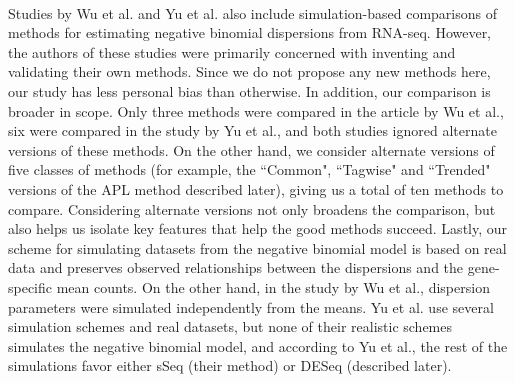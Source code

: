 \documentclass[10pt]{article}
\begin{document}
{\color{blue} \paragraph{} \indent Studies by Wu et al. \cite{dss} and Yu et al. \cite{yu} also include simulation-based comparisons of methods for estimating negative binomial dispersions from RNA-seq. However, the authors of these studies were primarily concerned with inventing and validating their own methods. Since we do not propose any new methods here, our study has less personal bias than otherwise. In addition, our comparison is broader in scope. Only three methods were compared in the article by Wu et al., six were compared in the study by Yu et al., and both studies ignored alternate versions of these methods. On the other hand, we consider alternate versions of five classes of methods (for example, the ``Common", ``Tagwise" and ``Trended" versions of the APL method described later), giving us a total of ten methods to compare. Considering alternate versions not only broadens the comparison, but also helps us isolate key features that help the good methods succeed. Lastly, our scheme for simulating datasets from the negative binomial model is based on real data and preserves observed relationships between the dispersions and the gene-specific mean counts. On the other hand, in the study by Wu et al., dispersion parameters were simulated independently from the means. Yu et al. use several simulation schemes and real datasets, but none of their realistic schemes simulates the negative binomial model, and according to Yu et al., the rest of the simulations favor either sSeq (their method) or DESeq (described later). }
\end{document}
